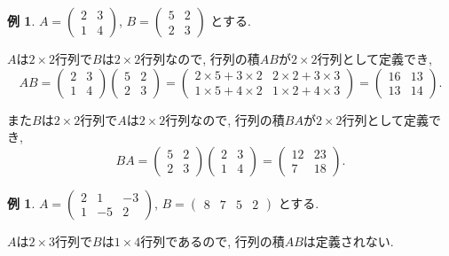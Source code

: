 \documentclass[dvipdfmx,a4paper,11pt]{article}
\theoremstyle{definition}
\newtheorem{exa}[thm]{例}
\begin{document}
 \begin{exa}
 $ A= 
 \begin{pmatrix}
2 & 3\\
1 & 4
 \end{pmatrix}
 $, $
 B = 
 \begin{pmatrix}
5 & 2\\
2 & 3
 \end{pmatrix}
 $
 とする. 
 
 $A$は$2\times 2$行列で$B$は$2 \times 2$行列なので, 行列の積$AB$が$2 \times 2$行列として定義でき, 
 $$
 AB = 
 \begin{pmatrix}
2 & 3\\
1 & 4
 \end{pmatrix}
 \begin{pmatrix}
5 & 2\\
2 & 3
 \end{pmatrix}
 =  
 \begin{pmatrix}
2 \times 5 + 3 \times 2& 2 \times 2 + 3 \times 3\\
1 \times 5 + 4 \times 2 & 1\times 2 + 4 \times 3
 \end{pmatrix}
 = 
 \begin{pmatrix}
16 & 13\\
13 & 14
 \end{pmatrix}.
 $$
 
また$B$は$2\times 2$行列で$A$は$2 \times 2$行列なので, 行列の積$BA$が$2 \times 2$行列として定義でき, 
 $$
 BA = 
  \begin{pmatrix}
5 & 2\\
2 & 3
 \end{pmatrix}
  \begin{pmatrix}
2 & 3\\
1 & 4
 \end{pmatrix}
 =
  \begin{pmatrix}
12 & 23\\
7 & 18
 \end{pmatrix}.
 $$
 \end{exa}
 
  \begin{exa}
 $ A= 
 \begin{pmatrix}
2 & 1&-3\\
1 & -5 & 2
 \end{pmatrix}
 $, $
 B = 
  \begin{pmatrix}
8 & 7&5 & 2
 \end{pmatrix}
 $
 とする. 
 
 $A$は$2 \times 3$行列で$B$は$1 \times 4$行列であるので, 行列の積$AB$は定義されない.
 \end{exa}
 
\end{document}
